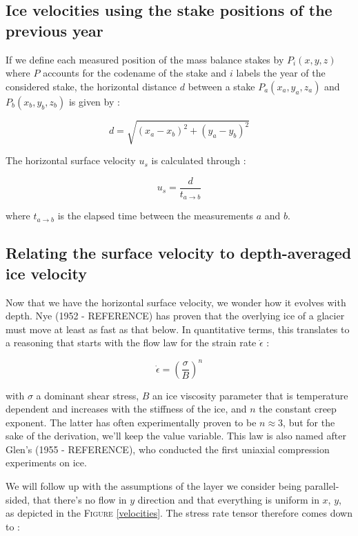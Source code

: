 \subsection*{Ice velocities using the stake positions of the previous year}

If we define each measured position of the mass balance stakes by $P_i(x,y,z)$ where $P$ accounts for the codename of the stake and $i$ labels the year of the considered stake, the horizontal distance $d$ between a stake $P_a(x_a, y_a, z_a)$ and $P_b(x_b, y_b, z_b)$ is given by :

\begin{equation}d = \sqrt{(x_a - x_b)^2 + (y_a - y_b)^2}\end{equation}

The horizontal surface velocity $u_s$ is calculated through :

\begin{equation}
\boxed{u_s = \frac{d}{t_{a \rightarrow b}}}
\end{equation}

where $t_{a \rightarrow b}$ is the elapsed time between the measurements $a$ and $b$.


\subsection*{Relating the surface velocity to depth-averaged ice velocity}

Now that we have the horizontal surface velocity, we wonder how it evolves with depth. Nye (1952 - REFERENCE) has proven that the overlying ice of a glacier must move at least as fast as that below. In quantitative terms, this translates to a reasoning that starts with the flow law for the strain rate $\dot{\epsilon}$ :

\begin{equation}\dot{\epsilon} = \left( \frac{\sigma}{B} \right)^n\end{equation}

with $\sigma$ a dominant shear stress, $B$ an ice viscosity parameter that is temperature dependent and increases with the stiffness of the ice, and $n$ the constant creep exponent. The latter has often experimentally proven to be $n \approx 3$, but for the sake of the derivation, we'll keep the value variable.
This law is also named after Glen's (1955 - REFERENCE), who conducted the first uniaxial compression experiments on ice.

We will follow up with the assumptions of the layer we consider being parallel-sided, that there's no flow in $y$ direction and that everything is uniform in $x$, $y$, as depicted in the \textsc{Figure} \ref{velocities}. The stress rate tensor therefore comes down to :


